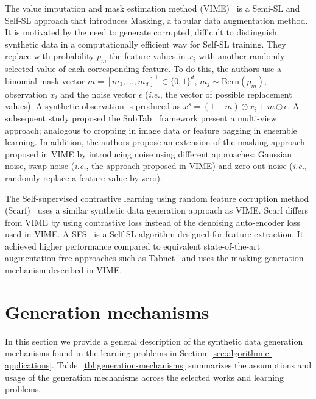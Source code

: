 \documentclass[parskip=full]{scrartcl}
\begin{document}
The value imputation and mask estimation method (VIME)~\cite{yoon2020vime} is
a Semi-SL and Self-SL approach that introduces Masking, a tabular data
augmentation method. It is motivated by the need to generate corrupted,
difficult to distinguish synthetic data in a computationally efficient way for
Self-SL training. They replace with probability $p_m$ the feature values in $x_i$
with another randomly selected value of each corresponding feature. To do
this, the authors use a binomial mask vector $m=[m_1, \ldots, m_d]^\bot \in
\{0,1\}^d$, $m_j \sim \text{Bern}(p_m)$, observation $x_i$ and the noise vector
$\epsilon$ (\textit{i.e.}, the vector of possible replacement values). A
synthetic observation is produced as $x^s=(1-m) \odot x_i + m \odot \epsilon$.
A subsequent study proposed the SubTab~\cite{ucar2021subtab} framework present
a multi-view approach; analogous to cropping in image data or feature bagging
in ensemble learning. In addition, the authors propose an extension of the
masking approach proposed in VIME by introducing noise using different
approaches: Gaussian noise, swap-noise (\textit{i.e.}, the approach proposed
in VIME) and zero-out noise (\textit{i.e.}, randomly replace a feature value
by zero).

The Self-supervised contrastive learning using random feature corruption
method (Scarf)~\cite{bahri2022scarf} uses a similar synthetic data generation
approach as VIME. Scarf differs from VIME by using contrastive loss instead of
the denoising auto-encoder loss used in VIME. A-SFS~\cite{qiu2022sfs} is a
Self-SL algorithm designed for feature extraction. It achieved higher
performance compared to equivalent state-of-the-art augmentation-free
approaches such as Tabnet~\cite{arik2021tabnet} and uses the masking
generation mechanism described in VIME.



\section{Generation mechanisms}\label{sec:generation-mechanisms}

In this section we provide a general description of the synthetic data
generation mechanisms found in the learning problems in
Section~\ref{sec:algorithmic-applications}.
Table~\ref{tbl:generation-mechanisms} summarizes the assumptions and
usage of the generation mechanisms across the selected works and learning
problems.
\end{document}
